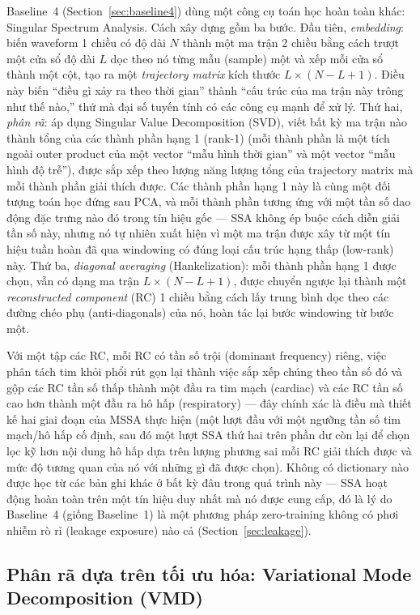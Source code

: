 \documentclass[11pt]{article}
\begin{document}
Baseline~4 (Section~\ref{sec:baseline4}) dùng một công cụ toán học hoàn
toàn khác: Singular Spectrum Analysis. Cách xây dựng gồm ba bước. Đầu
tiên, \emph{embedding}: biến waveform 1 chiều có độ dài $N$ thành một ma
trận 2 chiều bằng cách trượt một cửa sổ độ dài $L$ dọc theo nó từng mẫu
(sample) một và xếp mỗi cửa sổ thành một cột, tạo ra một \emph{trajectory
matrix} kích thước $L\times(N-L+1)$. Điều này biến ``điều gì xảy ra theo
thời gian'' thành ``cấu trúc của ma trận này trông như thế nào,'' thứ mà
đại số tuyến tính có các công cụ mạnh để xử lý. Thứ hai, \emph{phân rã}:
áp dụng Singular Value Decomposition (SVD), viết bất kỳ ma trận nào thành
tổng của các thành phần hạng 1 (rank-1) (mỗi thành phần là một tích ngoài
outer product của một vector ``mẫu hình thời gian'' và một vector ``mẫu
hình độ trễ''), được sắp xếp theo lượng năng lượng tổng của trajectory
matrix mà mỗi thành phần giải thích được. Các thành phần hạng 1 này là
cùng một đối tượng toán học đứng sau PCA, và mỗi thành phần tương ứng với
một tần số dao động đặc trưng nào đó trong tín hiệu gốc --- SSA không ép
buộc cách diễn giải tần số này, nhưng nó tự nhiên xuất hiện vì một ma trận
được xây từ một tín hiệu tuần hoàn đã qua windowing có đúng loại cấu trúc
hạng thấp (low-rank) này. Thứ ba, \emph{diagonal averaging} (Hankelization):
mỗi thành phần hạng 1 được chọn, vẫn có dạng ma trận $L\times(N-L+1)$,
được chuyển ngược lại thành một \emph{reconstructed component} (RC) 1
chiều bằng cách lấy trung bình dọc theo các đường chéo phụ (anti-diagonals)
của nó, hoàn tác lại bước windowing từ bước một.

Với một tập các RC, mỗi RC có tần số trội (dominant frequency) riêng, việc
phân tách tim khỏi phổi rút gọn lại thành việc sắp xếp chúng theo tần số
đó và gộp các RC tần số thấp thành một đầu ra tim mạch (cardiac) và các RC
tần số cao hơn thành một đầu ra hô hấp (respiratory) --- đây chính xác là
điều mà thiết kế hai giai đoạn của MSSA thực hiện (một lượt đầu với một
ngưỡng tần số tim mạch/hô hấp cố định, sau đó một lượt SSA thứ hai trên
phần dư còn lại để chọn lọc kỹ hơn nội dung hô hấp dựa trên lượng phương
sai mỗi RC giải thích được và mức độ tương quan của nó với những gì đã
được chọn). Không có dictionary nào được học từ các bản ghi khác ở bất kỳ
đâu trong quá trình này --- SSA hoạt động hoàn toàn trên một tín hiệu duy
nhất mà nó được cung cấp, đó là lý do Baseline~4 (giống Baseline~1) là một
phương pháp zero-training không có phơi nhiễm rò rỉ (leakage exposure)
nào cả (Section~\ref{sec:leakage}).

\subsection{Phân rã dựa trên tối ưu hóa: Variational Mode Decomposition (VMD)}
\label{sec:bg-vmd}
\end{document}
